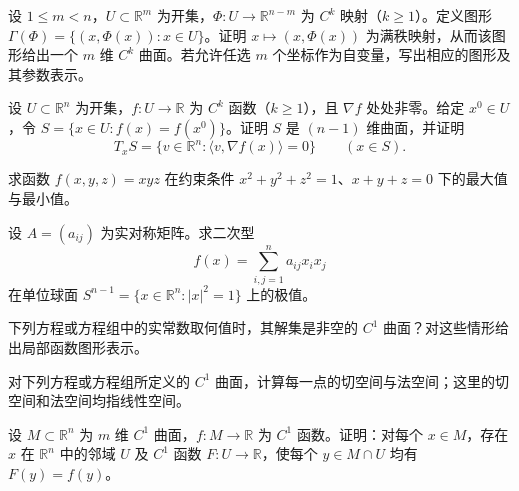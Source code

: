 \newpage
\noindent\begin{minipage}{\textwidth}
设 $1\le m<n$，$U\subset\mathbb R^m$ 为开集，$\Phi:U\to\mathbb R^{n-m}$ 为 $C^k$ 映射（$k\ge1$）。定义图形 $\Gamma(\Phi)=\{(x,\Phi(x)):x\in U\}$。证明 $x\mapsto(x,\Phi(x))$ 为满秩映射，从而该图形给出一个 $m$ 维 $C^k$ 曲面。若允许任选 $m$ 个坐标作为自变量，写出相应的图形及其参数表示。
\end{minipage}\par\vfill
\noindent\begin{minipage}{\textwidth}
设 $U\subset\mathbb R^n$ 为开集，$f:U\to\mathbb R$ 为 $C^k$ 函数（$k\ge1$），且 $\nabla f$ 处处非零。给定 $x^0\in U$，令 $S=\{x\in U:f(x)=f(x^0)\}$。证明 $S$ 是 $(n-1)$ 维曲面，并证明\[T_xS=\{v\in\mathbb R^n:\langle v,\nabla f(x)\rangle=0\}\qquad(x\in S).\]
\end{minipage}\par\vfill
\noindent\begin{minipage}{\textwidth}
求函数 $f(x,y,z)=xyz$ 在约束条件 $x^2+y^2+z^2=1$、$x+y+z=0$ 下的最大值与最小值。
\end{minipage}\par\vfill
\noindent\begin{minipage}{\textwidth}
设 $A=(a_{ij})$ 为实对称矩阵。求二次型\[f(x)=\sum_{i,j=1}^n a_{ij}x_ix_j\]在单位球面 $S^{n-1}=\{x\in\mathbb R^n:|x|^2=1\}$ 上的极值。
\end{minipage}\par\vfill
\newpage
\noindent\begin{minipage}{\textwidth}
下列方程或方程组中的实常数取何值时，其解集是非空的 $C^1$ 曲面？对这些情形给出局部函数图形表示。
\end{minipage}\par\vfill
\noindent\begin{minipage}{\textwidth}
对下列方程或方程组所定义的 $C^1$ 曲面，计算每一点的切空间与法空间；这里的切空间和法空间均指线性空间。
\end{minipage}\par\vfill
\noindent\begin{minipage}{\textwidth}
设 $M\subset\mathbb R^n$ 为 $m$ 维 $C^1$ 曲面，$f:M\to\mathbb R$ 为 $C^1$ 函数。证明：对每个 $x\in M$，存在 $x$ 在 $\mathbb R^n$ 中的邻域 $U$ 及 $C^1$ 函数 $F:U\to\mathbb R$，使每个 $y\in M\cap U$ 均有 $F(y)=f(y)$。
\end{minipage}\par\vfill
